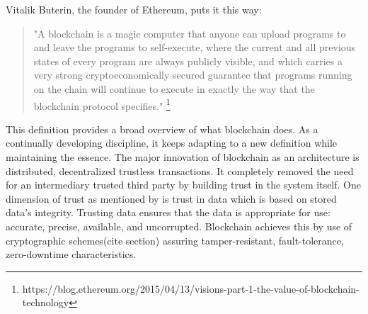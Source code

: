 Vitalik Buterin, the founder of Ethereum, puts it this way:  
\begin{quote}
	\centering
	"A blockchain is a magic computer that anyone can upload programs to and
	leave the programs to self-execute, where the current and all previous
	states of every program are always publicly visible, and which carries a
	very strong cryptoeconomically secured guarantee that programs running on
	the chain will continue to execute in exactly the way that the blockchain
	protocol specifies."
	\footnote{https://blog.ethereum.org/2015/04/13/visions-part-1-the-value-of-blockchain-technology} 
\end{quote}
This definition provides a broad overview of what blockchain does. As a
continually developing discipline, it keeps adapting to a new definition while
maintaining the essence. The major innovation of blockchain as an architecture
is distributed, decentralized trustless transactions\cite{Bitcoin_Satoshi}. It
completely removed the need for an intermediary trusted third party by building
trust in the system itself. One dimension of trust as mentioned by
\cite{miller2010trust} is trust in data which is based on stored data's
integrity. Trusting data ensures that the data is appropriate for use:
accurate, precise, available, and uncorrupted\cite{miller2010trust}.
Blockchain achieves this by use of cryptographic schemes(cite section) assuring
tamper-resistant, fault-tolerance, zero-downtime
characteristics\cite{swan2015blockchain}. 
\newpage

 
